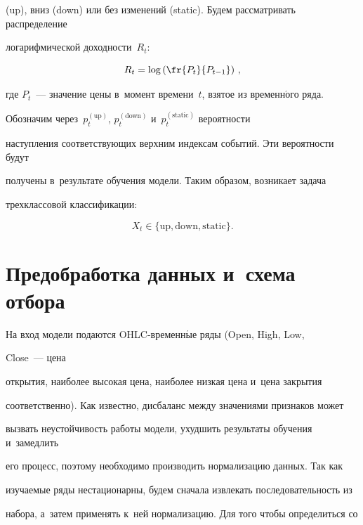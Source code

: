 (up), вниз (down) или без изменений (static). Будем рассматривать распределение 

логарифмической доходности~$R_t$:

\begin{equation*}

   R_t = \log\left(\fr{P_t}{P_{t-1}}\right)\,,

\end{equation*}

где $P_t$~--- значение цены в~момент времени~$t$, взятое из временн$\acute{\mbox{о}}$го ряда. 

Обозначим через~$p^{(\mathrm{up})}_t$, $p^{(\mathrm{down})}_t$ и~$p^{(\mathrm{static})}_t$ вероятности 

наступления соответствующих верхним индексам событий. Эти вероятности будут 

получены в~результате обуче\-ния модели. Таким образом, возникает задача 

трехклассовой классификации:

\begin{equation*}

   X_t \in {\{\mathrm{up, down, static}\}}.

\end{equation*}





\section{Предобработка данных и~схема отбора}



На вход модели подаются OHLC-вре\-мен\-н$\acute{\mbox{ы}}$е ряды (Open, High, Low, 

Close~--- цена 

открытия, наиболее высокая цена, наиболее низкая цена и~цена закрытия 

соответственно). Как известно, дисбаланс между значениями признаков может 

вызвать неустойчивость работы модели, ухудшить результаты обучения и~замедлить 

его процесс, поэтому необходимо производить нормализацию данных. Так как 

изучаемые ряды нестационарны, будем сначала извлекать последовательность из 

набора, а~затем применять к~ней нормализацию. Для того чтобы определиться со 

